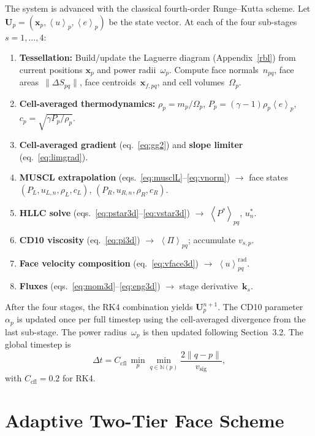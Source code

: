 \documentclass[twocolumn]{aastex63}
\newcommand{\vel}{{u}}
\newcommand{\surf}[0]{S}
\newcommand{\vect}[1]{\mathbf{#1}}
\begin{document}
The system is advanced with the classical fourth-order
Runge--Kutta scheme.
Let $\mathbf{U}_p = (\vect{x}_p, \left<\vel\right>_p,
  \left<e\right>_p)$ be the state vector.
At each of the four sub-stages $s=1,\ldots,4$:
\begin{enumerate}[label=(\alph*)]
  \item \textbf{Tessellation:}
    Build/update the Laguerre diagram
    (Appendix~\ref{rbl}) from current positions
    $\vect{x}_p$ and power radii~$\omega_p$.
    Compute face normals~$\hat{n}_{pq}$,
    face areas~$\|\Delta\surf_{pq}\|$,
    face centroids~$\vect{x}_{f,pq}$, and
    cell volumes~$\Omega_p$.
  \item \textbf{Cell-averaged thermodynamics:}
    $\rho_p = m_p/\Omega_p$,\;
    $P_p = (\gamma-1)\rho_p\left<e\right>_p$,\;
    $c_p = \sqrt{\gamma P_p/\rho_p}$.
  \item \textbf{Cell-averaged gradient}
    (eq.~\ref{eq:gg2}) and
    \textbf{slope limiter}
    (eq.~\ref{eq:limgrad}).
  \item \textbf{MUSCL extrapolation}
    (eqs.~\ref{eq:musclL}--\ref{eq:vnorm})
    $\rightarrow$ face states
    $(P_L, \vel_{L,n}, \rho_L, c_L)$,
    $(P_R, \vel_{R,n}, \rho_R, c_R)$.
  \item \textbf{HLLC solve}
    (eqs.~\ref{eq:pstar3d}--\ref{eq:vstar3d})
    $\rightarrow$ $\left<P^*\right>_{pq}$, $\vel^*_n$.
  \item \textbf{CD10 viscosity}
    (eq.~\ref{eq:pi3d}) $\rightarrow$
    $\left<\Pi\right>_{pq}$;
    accumulate $v_{s,p}$.
  \item \textbf{Face velocity composition}
    (eq.~\ref{eq:vface3d}) $\rightarrow$
    $\left<\vel\right>_{pq}^\textrm{rad}$.
  \item \textbf{Fluxes}
    (eqs.~\ref{eq:mom3d}--\ref{eq:eng3d})
    $\rightarrow$ stage derivative~$\mathbf{k}_s$.
\end{enumerate}
After the four stages, the RK4 combination yields
$\mathbf{U}_p^{n+1}$.
The CD10 parameter $\alpha_p$ is updated once per full
timestep using the cell-averaged divergence from the
last sub-stage.
The power radius~$\omega_p$ is then updated following
Section~3.2.
The global timestep is
\begin{equation}
  \Delta t = C_\textrm{cfl}\,
    \min_p\min_{q\in\mathbb{N}(p)}
    \frac{2\|q - p\|}{v_\mathrm{sig}},
\end{equation}
with $C_\textrm{cfl} = 0.2$ for RK4.


\section{Adaptive Two-Tier Face Scheme}
\label{sec:twotier}
\end{document}
